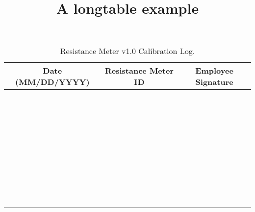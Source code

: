 \documentclass{article}
\title{A longtable example}
\begin{document}
\begin{center}
\begin{longtable}{|l|l|l|}
\caption{Resistance Meter v1.0 Calibration Log.} \label{tab:long} \\

\hline \multicolumn{1}{|c|}{\textbf{Date (MM/DD/YYYY)}} & \multicolumn{1}{c|}{\textbf{Resistance Meter ID}} & \multicolumn{1}{c|}{\textbf{Employee Signature}} \\ \hline \hline
\endfirsthead

\hline
\endfoot

 &  & \\
 &  & \\ \hline
 &  & \\
 &  & \\ \hline
 &  & \\
 &  & \\ \hline
 &  & \\
 &  & \\ \hline
 &  & \\
 &  & \\ \hline
 &  & \\
 &  & \\ \hline
 &  & \\
 &  & \\ \hline
 &  & \\
 &  & \\ \hline
 &  & \\
 &  & \\ \hline
 &  & \\
 &  & \\ \hline
 &  & \\
 &  & \\ \hline
 &  & \\
 &  & \\ \hline
 &  & \\
 &  & \\ \hline
 &  & \\
 &  & \\ \hline
 &  & \\
 &  & \\ \hline
 &  & \\
 &  & \\ \hline
 &  & \\
 &  & \\ \hline
 &  & \\
 &  & \\ \hline
 &  & \\
 &  & \\ \hline
 &  & \\
 &  & \\
 

\end{longtable}
\end{center}
\end{document}
